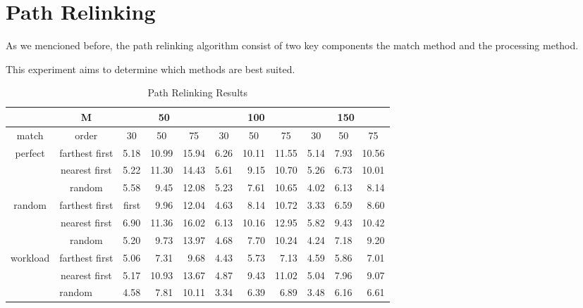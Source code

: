 \section{Path Relinking}
As we mencioned before,
the path relinking algorithm
consist of two key components
the match method and the processing method.

This experiment aims to determine which methods are best suited.

\begin{table}[]
  \centering
  \label{my-label}
  \begin{tabular}{c|c|rrr|rrr|rrr|}
    \cline{2-11}
    \multicolumn{1}{l|}{} & M
    & \multicolumn{3}{c|}{50} 
    & \multicolumn{3}{c|}{100}
    & \multicolumn{3}{c|}{150}
    \\ \hline
    \multicolumn{1}{|c|}{match} & order
    & \multicolumn{1}{c}{30} & \multicolumn{1}{c}{50} & \multicolumn{1}{c|}{75}
    & \multicolumn{1}{c}{30} & \multicolumn{1}{c}{50} & \multicolumn{1}{c|}{75}
    & \multicolumn{1}{c}{30} & \multicolumn{1}{c}{50} & \multicolumn{1}{c|}{75}
    \\ \hline
    \multicolumn{1}{|c|}{\multirow{3}{*}{perfect}}
    & farthest first
    & 5.18       & 10.99      & 15.94
    & 6.26       & 10.11      & 11.55
    & 5.14       & 7.93       & 10.56
    \\
    \multicolumn{1}{|c|}{}
    & nearest first
    & 5.22       & 11.30      & 14.43
    & 5.61       & 9.15       & 10.70
    & 5.26       & 6.73       & 10.01
    \\
    \multicolumn{1}{|c|}{}
    & random
    & 5.58       & 9.45       & 12.08
    & 5.23       & 7.61       & 10.65
    & 4.02       & 6.13       & 8.14
    \\ \hline
    \multicolumn{1}{|c|}{\multirow{3}{*}{random}}
    & farthest first
    & first      & 9.96       & 12.04
    & 4.63       & 8.14       & 10.72
    & 3.33       & 6.59       & 8.60
    \\
    \multicolumn{1}{|c|}{}
    & nearest first
    & 6.90       & 11.36      & 16.02
    & 6.13       & 10.16      & 12.95
    & 5.82       & 9.43       & 10.42
    \\
    \multicolumn{1}{|c|}{}
    & random
    & 5.20       & 9.73       & 13.97
    & 4.68       & 7.70       & 10.24
    & 4.24       & 7.18       & 9.20
    \\ \hline
    \multicolumn{1}{|c|}{\multirow{3}{*}{workload}}
    & farthest first
    & 5.06       & 7.31       & 9.68
    & 4.43       & 5.73       & 7.13
    & 4.59       & 5.86       & 7.01
    \\
    \multicolumn{1}{|c|}{}
    & nearest first
    & 5.17       & 10.93      & 13.67
    & 4.87       & 9.43       & 11.02
    & 5.04       & 7.96       & 9.07
    \\
    \multicolumn{1}{|c|}{}
    & \multicolumn{1}{l|}{random}
    & 4.58       & 7.81       & 10.11
    & 3.34       & 6.39       & 6.89
    & 3.48       & 6.16       & 6.61
    \\ \hline
  \end{tabular}
  \caption{Path Relinking Results}
\end{table}
